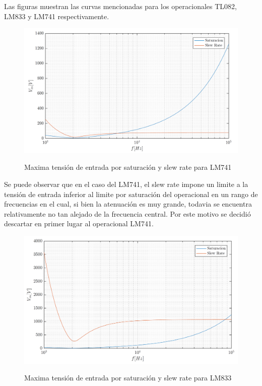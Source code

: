 Las figuras muestran las curvas mencionadas para los operacionales TL082, LM833 y LM741 respectivamente.

\begin{figure}[H]
\centering
\includegraphics[scale=0.4]{resources/vin_max_LM741}
\label{1_vin_max_LM741}
\caption{Maxima tensión de entrada por saturación y slew rate para LM741}
\end{figure}

Se puede observar que en el caso del LM741, el slew rate impone un limite a la tensión de entrada inferior al limite por saturación del operacional en un rango de frecuencias en el cual, si bien la atenuación es muy grande, todavia se encuentra relativamente no tan alejado de la frecuencia central. Por este motivo se decidió descartar en primer lugar al operacional LM741.

\begin{figure}[H]
\centering
\includegraphics[scale=0.4]{resources/vin_max_LM833}
\label{1_vin_max_LM833}
\caption{Maxima tensión de entrada por saturación y slew rate para LM833}
\end{figure}

